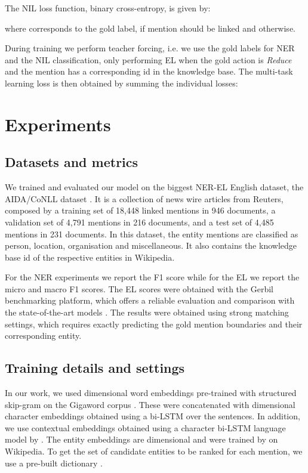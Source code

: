 \documentclass[11pt,a4paper,dvipsnames]{article}
\begin{document}
The NIL loss function, binary cross-entropy, is given by:


where  corresponds to the gold label,  if mention should be linked and  otherwise.

During training we perform teacher forcing, i.e. we use the gold labels for NER and the NIL classification, only performing EL when the gold action is \textit{Reduce} and the mention has a corresponding id in the knowledge base. The multi-task learning loss is then obtained by summing the individual losses:



\section{Experiments}

\subsection{Datasets and metrics}
We trained and evaluated our model on the biggest NER-EL English dataset, the AIDA/CoNLL dataset \citep{Hoffart2011}. It is a collection of news wire articles from Reuters, composed by a training set of 18,448 linked mentions in 946 documents, a validation set of 4,791 mentions in 216 documents, and a test set of 4,485 mentions in 231 documents. In this dataset, the entity mentions are classified as person, location, organisation and miscellaneous. It also contains the knowledge base id of the respective entities in Wikipedia.

For the NER experiments we report the F1 score while for the EL we report the micro and macro F1 scores. The EL scores were obtained with the Gerbil benchmarking platform, which offers a reliable evaluation and comparison with the state-of-the-art models \cite{roder2017gerbil}. The results were obtained using strong matching settings, which requires exactly predicting
the gold mention boundaries and their corresponding entity.

\subsection{Training details and settings}

In our work, we used  dimensional word embeddings pre-trained with structured skip-gram on the Gigaword corpus \cite{wang_sskipgr}. These were concatenated with  dimensional character embeddings obtained using a bi-LSTM over the sentences. In addition, we use contextual embeddings obtained using a character bi-LSTM language model by \citet{Akbik_flair}.
The entity embeddings are  dimensional and were trained by \citet{YamadaSTT17} on Wikipedia. To get the set of candidate entities to be ranked for each mention, we use a pre-built dictionary  \cite{pershina2015personalized}.
\end{document}
